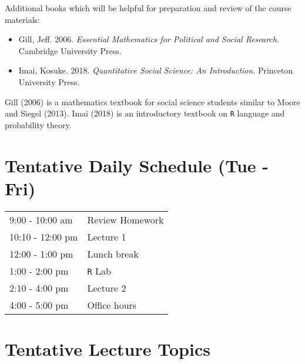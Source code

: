 \documentclass[pdflatex, letterpaper, 12pt]{scrartcl}
\begin{document}
\medskip
Additional books which will be helpful for preparation and review of the course materials:
\begin{itemize}
\item Gill, Jeff. 2006. \emph{Essential Mathematics for Political and Social Research}. Cambridge University Press.
\item Imai, Kosuke. 2018. \emph{Quantitative Social Science: An Introduction}. Princeton University Press.
\end{itemize}
Gill (2006) is a mathematics textbook for social science students similar to Moore and Siegel (2013). Imai (2018) is an introductory textbook on \texttt{R} language and probability theory. 

\section*{Tentative Daily Schedule (Tue - Fri)}

\begin{table}[H]
\begin{tabular}{l l }
9:00 - 10:00 am & Review Homework \\
10:10 - 12:00 pm & Lecture 1 \\
12:00 - 1:00 pm & Lunch break \\
1:00 - 2:00 pm & \texttt{R} Lab \\
2:10 - 4:00 pm & Lecture 2 \\
4:00 - 5:00 pm & Office hours \\
\end{tabular}
\end{table}

\section*{Tentative Lecture Topics}
\end{document}
